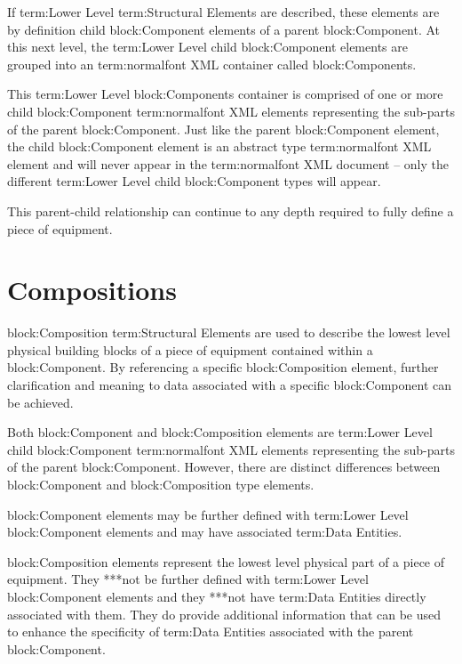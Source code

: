 If {term:Lower Level} {term:Structural Elements} are described, these elements are by definition child {block:Component} elements of a parent {block:Component}. At this next level, the {term:Lower Level} child {block:Component} elements are grouped into an {term:normalfont XML} container called {block:Components}.
 
This {term:Lower Level} {block:Components} container is comprised of one or more child {block:Component} {term:normalfont XML} elements representing the sub-parts of the parent {block:Component}. Just like the parent {block:Component} element, the child {block:Component} element is an abstract type {term:normalfont XML} element and will never appear in the {term:normalfont XML} document – only the different {term:Lower Level} child {block:Component} types will appear.

This parent-child relationship can continue to any depth required to fully define a piece of equipment.




\section{Compositions}
\label{sec:Compositions}
{block:Composition} {term:Structural Elements} are used to describe the lowest level physical building blocks of a piece of equipment contained within a {block:Component}. By referencing a specific {block:Composition} element, further clarification and meaning to data associated with a specific {block:Component} can be achieved.

Both {block:Component} and {block:Composition} elements are {term:Lower Level} child {block:Component} {term:normalfont XML} elements representing the sub-parts of the parent {block:Component}.  However, there are distinct differences between {block:Component} and {block:Composition} type elements.

{block:Component} elements may be further defined with {term:Lower Level} {block:Component} elements and may have associated {term:Data Entities}.

{block:Composition} elements represent the lowest level physical part of a piece of equipment.  They **\must**not be further defined with {term:Lower Level} {block:Component} elements and they **\must**not have {term:Data Entities} directly associated with them.   They do provide additional information that can be used to enhance the specificity of {term:Data Entities} associated with the parent {block:Component}.



